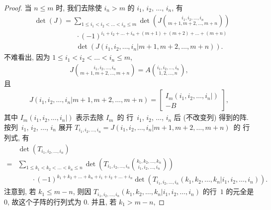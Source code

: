 \documentclass[%
    UTF8,%
    fontset=none,%
    punct=kaiming,%
    zihao=-4,%
    a4paper,%
    oneside,%
]{ctexbook}
\renewcommand*{\leq}{\leqslant}
\begin{document}
\begin{proof}
    当 \(n \leq m\) 时,
    我们去除使 \(i_n > m\) 的
    \(i_1\), \(i_2\), \(\dots\), \(i_n\),
    有
    \begin{align*}
         &
        \det {(J)}
        = \sum_{1 \leq i_1 < i_2 < \dots < i_n \leq m}
        {\det {\left(
                J\binom{i_1,i_2,\dots,i_n}{m+1,m+2,\dots,m+n}
                \right)}}
        \\
         &
        \qquad \qquad \qquad
        \cdot (-1)^{i_1 + i_2 + \dots + i_n
            + (m+1) + (m+2) + \dots + (m+n)}
        \\
         &
        \qquad \qquad \qquad
        \det {(J({i_1,i_2,\dots,i_n}|{m+1,m+2,\dots,m+n}))}.
    \end{align*}
    不难看出,
    因为 \(1 \leq i_1 < i_2 < \dots < i_n \leq m\),
    \begin{align*}
        J\binom{i_1,i_2,\dots,i_n}{m+1,m+2,\dots,m+n}
        = A\binom{i_1,i_2,\dots,i_n}{1,2,\dots,n},
    \end{align*}
    且
    \begin{align*}
        J({i_1,i_2,\dots,i_n}|{m+1,m+2,\dots,m+n})
        =
        \begin{bmatrix}
            I_m (i_1,i_2,\dots,i_n|) \\
            -B
        \end{bmatrix},
    \end{align*}
    其中
    \(I_m (i_1,i_2,\dots,i_n|)\)
    表示去除 \(I_m\)~的%
    行~\(i_1\), \(i_2\), \(\dots\), \(i_n\)
    后 (不改变列) 得到的阵.
    按列~\(i_1\), \(i_2\), \(\dots\), \(i_n\) 展开
    \(T_{i_1,i_2,\dots,i_n}
    = J({i_1,i_2,\dots,i_n}|{m+1,m+2,\dots,m+n})\)~的%
    行列式, 有
    \begin{align*}
             & \det {(T_{i_1,i_2,\dots,i_n})}
        \\
        = {} &
        \sum_{1 \leq k_1 < k_2 < \dots < k_n \leq n}
        {\det {\left(
                T_{i_1,i_2,\dots,i_n}
                \binom{k_1, k_2, \dots, k_n}{i_1, i_2, \dots, i_n}
                \right)}}
        \\
             &
        \qquad
        \cdot (-1)^{k_1 + k_2 + \dots + k_n
            + i_1 + i_2 + \dots + i_n}
        \det {(T_{i_1,i_2,\dots,i_n}
        ({k_1,k_2,\dots,k_n}|{i_1,i_2,\dots,i_n}))}.
    \end{align*}
    注意到, 若 \(k_1 \leq m-n\),
    则因 \(T_{i_1,i_2,\dots,i_n}
    ({k_1,k_2,\dots,k_n}|{i_1,i_2,\dots,i_n})\)
    的行~\(1\) 的元全是 \(0\),
    故这个子阵的行列式为 \(0\).
    并且, 若 \(k_1 > m-n\),

\end{proof}
\end{document}
